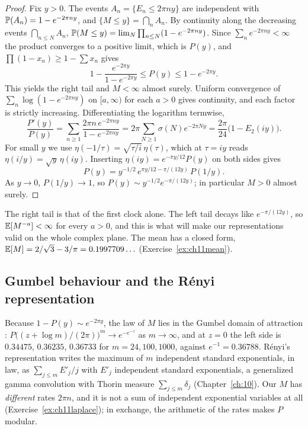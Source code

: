 \begin{proof}
Fix $y>0$. The events $A_n=\{E_n\le2\pi ny\}$ are independent with $\mathbb{P}(A_n)=1-e^{-2\pi ny}$, and $\{M\le y\}=\bigcap_nA_n$. By continuity along the decreasing events $\bigcap_{n\le N}A_n$, $\mathbb{P}(M\le y)=\lim_N\prod_{n\le N}(1-e^{-2\pi ny})$. Since $\sum_ne^{-2\pi ny}<\infty$ the product converges to a positive limit, which is $P(y)$, and $\prod(1-x_n)\ge1-\sum x_n$ gives
\[
1-\frac{e^{-2\pi y}}{1-e^{-2\pi y}}\le P(y)\le1-e^{-2\pi y}.
\]
This yields the right tail and $M<\infty$ almost surely. Uniform convergence of $\sum_n\log(1-e^{-2\pi ny})$ on $[a,\infty)$ for each $a>0$ gives continuity, and each factor is strictly increasing. Differentiating the logarithm termwise,
\[
\frac{P'(y)}{P(y)}=\sum_{n\ge1}\frac{2\pi n\,e^{-2\pi ny}}{1-e^{-2\pi ny}}=2\pi\sum_{N\ge1}\sigma(N)e^{-2\pi Ny}=\frac{2\pi}{24}\bigl(1-E_2(iy)\bigr).
\]
For small $y$ we use $\eta(-1/\tau)=\sqrt{\tau/i}\,\eta(\tau)$, which at $\tau=iy$ reads $\eta(i/y)=\sqrt y\,\eta(iy)$. Inserting $\eta(iy)=e^{-\pi y/12}P(y)$ on both sides gives
\begin{equation}\label{eq:ch11Pmod}
P(y)=y^{-1/2}\,e^{\pi y/12-\pi/(12y)}\,P(1/y).
\end{equation}
As $y\to0$, $P(1/y)\to1$, so $P(y)\sim y^{-1/2}e^{-\pi/(12y)}$; in particular $M>0$ almost surely.
\end{proof}

The right tail is that of the first clock alone. The left tail decays like $e^{-\pi/(12y)}$, so $\mathbb{E}[M^{-a}]<\infty$ for every $a>0$, and this is what will make our representations valid on the whole complex plane. The mean has a closed form, $\mathbb{E}[M]=2/\sqrt3-3/\pi=0.1997709\ldots$ (Exercise~\ref{ex:ch11mean}).

\subsection{Gumbel behaviour and the R\'enyi representation}

Because $1-P(y)\sim e^{-2\pi y}$, the law of $M$ lies in the Gumbel domain of attraction \cite{fishertippett1928,gnedenko1943}: $P\bigl((z+\log m)/(2\pi)\bigr)^m\to e^{-e^{-z}}$ as $m\to\infty$, and at $z=0$ the left side is $0.34475$, $0.36235$, $0.36733$ for $m=24,100,1000$, against $e^{-1}=0.36788$. R\'enyi's representation \cite{renyi1953} writes the maximum of $m$ independent standard exponentials, in law, as $\sum_{j\le m}E'_j/j$ with $E'_j$ independent standard exponentials, a generalized gamma convolution with Thorin measure $\sum_{j\le m}\delta_j$ (Chapter~\ref{ch:10}). Our $M$ has \emph{different} rates $2\pi n$, and it is not a sum of independent exponential variables at all (Exercise~\ref{ex:ch11laplace}); in exchange, the arithmetic of the rates makes $P$ modular.

